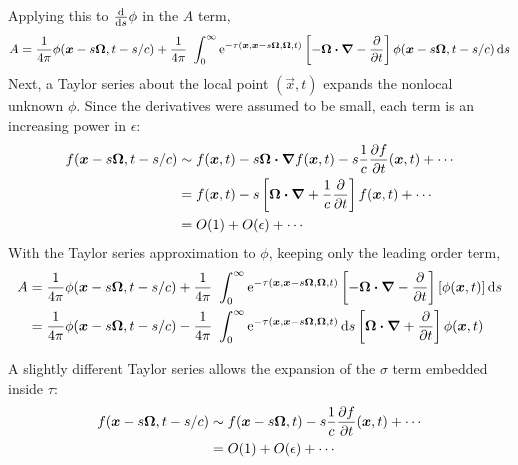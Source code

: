 Applying this to $\frac{\mathrm{d} }{\mathrm{d} s}\phi$ in the $A$ term,
\begin{equation*}
A = \frac{1}{4\pi}\phi(\bm{x} - s \bm{\Omega}, t-s/c)
+ \frac{1}{4\pi}\ \int_{0}^{\infty} \mathop{}\!\mathrm{e}^{-\tau(\bm{x}, \bm{x} - s \bm{\Omega}, \bm{\Omega}, t)}
\left[ -\bm{\Omega} \bm{\cdot} \bm{\nabla} - \frac{\partial }{\partial t} \right] \phi(\bm{x} - s \bm{\Omega}, t-s/c)
\mathop{}\!\mathrm{d} s
\end{equation*}
Next, a Taylor series about the local point $(\vec{x}, t)$ expands the
nonlocal unknown $\phi$. Since the derivatives were assumed to be small, each
term is an increasing power in $\epsilon$:
\begin{align*}
  f(\bm{x} - s \bm{\Omega}, t-s/c)
  &\sim
  f(\bm{x}, t) - s \bm{\Omega} \bm{\cdot} \bm{\nabla} f(\bm{x}, t)
  - s\frac{1}{c} \frac{\partial f}{\partial t}(\bm{x}, t) + \cdots
  \\
  &= f(\bm{x}, t) - s \left[ \bm{\Omega} \bm{\cdot} \bm{\nabla}
  + \frac{1}{c} \frac{\partial }{\partial t} \right] f(\bm{x}, t) + \cdots
  \\
  &= O(1) +
  O(\epsilon) + \cdots
\end{align*}
With the Taylor series approximation to $\phi$, keeping only the leading order
term,
\begin{align*}
A &= \frac{1}{4\pi}\phi(\bm{x} - s \bm{\Omega}, t-s/c)
+ \frac{1}{4\pi}\ \int_{0}^{\infty} \mathop{}\!\mathrm{e}^{-\tau(\bm{x}, \bm{x} - s \bm{\Omega}, \bm{\Omega}, t)}
\left[ -\bm{\Omega} \bm{\cdot} \bm{\nabla} - \frac{\partial }{\partial t} \right][\phi(\bm{x}, t)]
\mathop{}\!\mathrm{d} s
\\
&= \frac{1}{4\pi}\phi(\bm{x} - s \bm{\Omega}, t-s/c)
- \frac{1}{4\pi}\ \int_{0}^{\infty} \mathop{}\!\mathrm{e}^{-\tau(\bm{x}, \bm{x} - s \bm{\Omega}, \bm{\Omega}, t)}
\mathop{}\!\mathrm{d} s
\left[ \bm{\Omega} \bm{\cdot} \bm{\nabla} + \frac{\partial }{\partial t} \right]\phi(\bm{x}, t)
\end{align*}

A slightly different Taylor series allows the expansion of the $\sigma$ term
embedded inside $\tau$:
\begin{align*}
  f(\bm{x} - s \bm{\Omega}, t-s/c)
  &\sim
  f(\bm{x} - s \bm{\Omega}, t)
  - s\frac{1}{c} \frac{\partial f}{\partial t}(\bm{x}, t) + \cdots
  \\
  &= O(1) + O(\epsilon) + \cdots
\end{align*}

